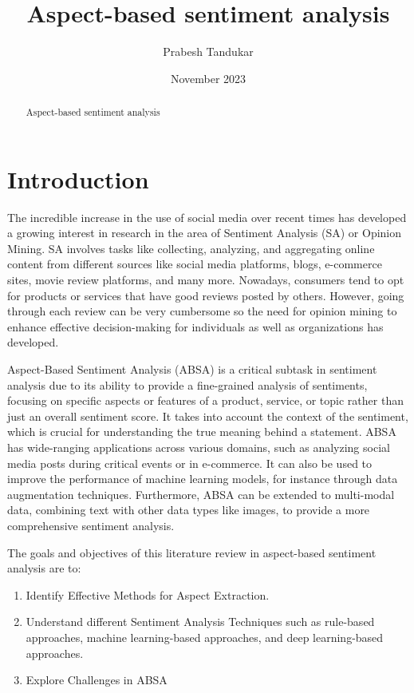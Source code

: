 \documentclass{article}
\title{Aspect-based sentiment analysis}
\author{Prabesh Tandukar}
\date{November 2023}
\begin{document}
\maketitle

\tableofcontents

\begin{abstract}
Aspect-based sentiment analysis
\end{abstract}

\section{Introduction}
The incredible increase in the use of social media over recent times has developed a growing interest in research in the area of Sentiment Analysis (SA) or Opinion Mining. SA involves tasks like collecting, analyzing, and aggregating online content from different sources like social media platforms, blogs, e-commerce sites, movie review platforms, and many more. Nowadays, consumers tend to opt for products or services that have good reviews posted by others. However, going through each review can be very cumbersome so the need for opinion mining to enhance effective decision-making for individuals as well as organizations has developed.\cite{ansari2020aspect} 

Aspect-Based Sentiment Analysis (ABSA) is a critical subtask in sentiment analysis due to its ability to provide a fine-grained analysis of sentiments, focusing on specific aspects or features of a product, service, or topic rather than just an overall sentiment score. It takes into account the context of the sentiment, which is crucial for understanding the true meaning behind a statement. ABSA has wide-ranging applications across various domains, such as analyzing social media posts during critical events or in e-commerce. It can also be used to improve the performance of machine learning models, for instance through data augmentation techniques. Furthermore, ABSA can be extended to multi-modal data, combining text with other data types like images, to provide a more comprehensive sentiment analysis.\cite{Jiang2023AspectBasedSA}\cite{Gomes2023GABSAPTGN} \cite{lvarezLpez2018APF} \cite{Bensoltane2021ComparingWE} \cite{zhao2023m2df}

The goals and objectives of this literature review in aspect-based sentiment analysis are to:
\begin{enumerate}
  \item Identify Effective Methods for Aspect Extraction.
  \item Understand different Sentiment Analysis Techniques such as rule-based approaches, machine learning-based approaches, and deep learning-based approaches.
  \item Explore Challenges in ABSA
\end{enumerate}
\end{document}

